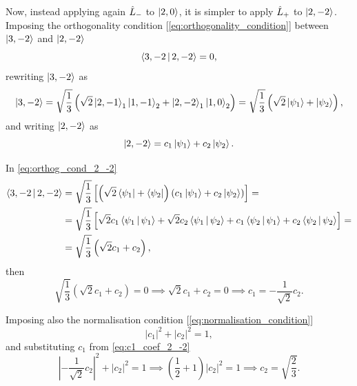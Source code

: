 Now, instead applying again $\hat{L}_{-}$ to $\Ket{2,0}$, it is simpler to apply $\hat{L}_{+}$ to $\Ket{2,-2}$.
Imposing the orthogonality condition [\cref{eq:orthogonality_condition}] between $\Ket{3,-2}$ and $\Ket{2,-2}$ 
\begin{equation}\label{eq:orthog_cond_2_-2}
    \Braket{3,-2 | 2,-2} = 0,
\end{equation}
rewriting $\Ket{3,-2}$ as 
\begin{equation}
    \Ket{3,-2} =
    \sqrt{\frac{1}{3}} \left( \sqrt{2} \Ket{2,-1}_1 \Ket{1,-1}_2 + \Ket{2,-2}_1 \Ket{1,0}_2 \right) =
    \sqrt{\frac{1}{3}} \left( \sqrt{2} \Ket{\psi_1} + \Ket{\psi_2} \right),
\end{equation}
and writing $\Ket{2,-2}$ as 
\begin{equation}\label{eq:aux_2_-2}
    \Ket{2,-2} =
    c_1 \Ket{\psi_1} + c_2 \Ket{\psi_2}.
\end{equation}

In \cref{eq:orthog_cond_2_-2}
\begin{align}
    \notag
    \Braket{3,-2 | 2,-2} &=
    \sqrt{\frac{1}{3}} \left[  
        \left( \sqrt{2} \Bra{\psi_1} + \Bra{\psi_2} \right)
        \left( c_1 \Ket{\psi_1} + c_2 \Ket{\psi_2} \right)
    \right]
    = \\
    \notag
    &=
    \sqrt{\frac{1}{3}} \left[  
        \sqrt{2} c_1 \Braket{\psi_1 | \psi_1} +
        \sqrt{2} c_2 \Braket{\psi_1 | \psi_2} +
        c_1 \Braket{\psi_2 | \psi_1} +
        c_2 \Braket{\psi_2 | \psi_2} 
    \right]
    = \\
    &=
    \sqrt{\frac{1}{3}} \left(
        \sqrt{2} c_1 +
        c_2
    \right),
\end{align}
then 
\begin{equation}\label{eq:c1_coef_2_-2}
    \sqrt{\frac{1}{3}} \left( \sqrt{2} c_1 + c_2 \right) = 0
    \implies
    \sqrt{2} c_1 + c_2 = 0
    \implies
    c_1 = - \frac{1}{\sqrt{2}} c_2.
\end{equation}

Imposing also the normalisation condition [\cref{eq:normalisation_condition}] 
\begin{equation}
    \left| c_1 \right|^2 + \left| c_2 \right|^2 = 1,
\end{equation}
and substituting $c_1$ from \cref{eq:c1_coef_2_-2}
\begin{equation}
    \left| - \frac{1}{\sqrt{2}} c_2 \right|^2 + \left| c_2 \right|^2 = 1
    \implies
    \left( \frac{1}{2} + 1 \right) \left| c_2 \right|^2 = 1
    \implies
    c_2 = \sqrt{\frac{2}{3}}.
\end{equation}

